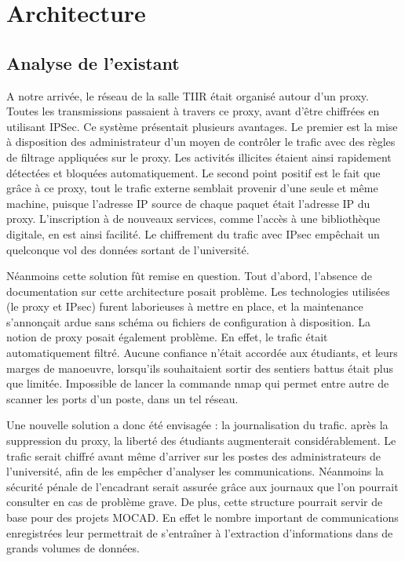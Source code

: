 \chapter{Architecture}
\label{chap:Architecture}

\section{Analyse de l'existant}

A notre arrivée, le réseau de la salle TIIR était organisé autour d'un proxy. Toutes les transmissions passaient à travers ce proxy, avant d'être chiffrées en utilisant IPSec. 
Ce système présentait plusieurs avantages. Le premier est la mise à disposition des administrateur d'un moyen de contrôler le trafic avec des règles de filtrage appliquées sur le proxy. Les activités illicites étaient ainsi rapidement détectées et bloquées automatiquement. Le second point positif est le fait que grâce à ce proxy, tout le trafic externe semblait provenir d'une seule et même machine, puisque l'adresse IP source de chaque paquet était l'adresse IP du proxy. L'inscription à de nouveaux services, comme l'accès à une bibliothèque digitale, en est ainsi facilité. Le chiffrement du trafic avec IPsec empêchait un quelconque vol des données sortant de l'université.

Néanmoins cette solution fût remise en question. Tout d'abord, l'absence de documentation sur cette architecture posait problème. Les technologies utilisées (le proxy et IPsec) furent laborieuses à mettre en place, et la maintenance s'annonçait ardue sans schéma ou fichiers de configuration à disposition. La notion de proxy posait également problème. En effet, le trafic était automatiquement filtré. Aucune confiance n'était accordée aux étudiants, et leurs marges de manoeuvre, lorsqu'ils souhaitaient sortir des sentiers battus était plus que limitée. Impossible de lancer la commande nmap qui permet entre autre de scanner les ports d'un poste, dans un tel réseau.

Une nouvelle solution a donc été envisagée : la journalisation du trafic. après la suppression du proxy, la liberté des étudiants augmenterait considérablement. Le trafic serait chiffré avant même d'arriver sur les postes des administrateurs de l'université, afin de les empêcher d'analyser les communications. Néanmoins la sécurité pénale de l'encadrant serait assurée grâce aux journaux que l'on pourrait consulter en cas de problème grave. De plus, cette structure pourrait servir de base pour des projets MOCAD. En effet le nombre important de communications enregistrées leur permettrait de s'entraîner à l'extraction d'informations dans de grands volumes de données.


